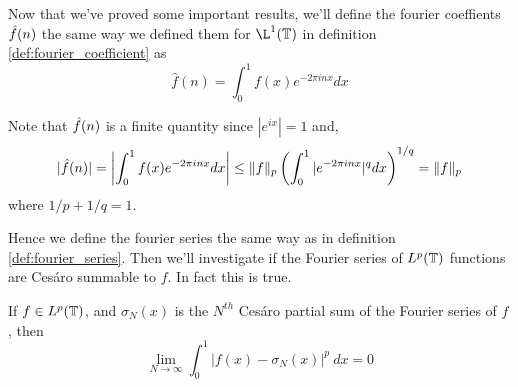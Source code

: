 Now that we've proved some important results, we'll define the fourier coeffients $\hat{f}(n)$ the same way we defined them for $\L^1(\T)$ in definition \ref{def:fourier_coefficient} as 
$$\hat{f}(n) = \int_0^1 f(x)e^{-2\pi inx} dx$$

Note that $\hat{f}(n)$ is a finite quantity since $|e^{ix}| = 1$ and,
$$ |\hat{f}(n)| = \left| \int_0^1 f(x)e^{-2\pi inx} dx \right| \le \|f\|_p\left(\int_0^1 |e^{-2\pi inx}|^q dx\right)^{1/q} = \|f\|_p $$ where $1/p + 1/q = 1$.

Hence we define the fourier series the same way as in definition \ref{def:fourier_series}. Then we'll investigate if the Fourier series of $L^p(\mathbb T)$ functions are Ces\'aro summable to $f$. In fact this is true.

\begin{theorem}
  If $f\in L^p(\mathbb T)$, and $\sigma_N(x)$ is the $N^{th}$ Ces\'aro partial sum of the Fourier series of $f$, then
  $$ \lim_{N \to \infty} \int_0^1 |f(x) - \sigma_N(x)|^p \ dx = 0$$
\end{theorem}

